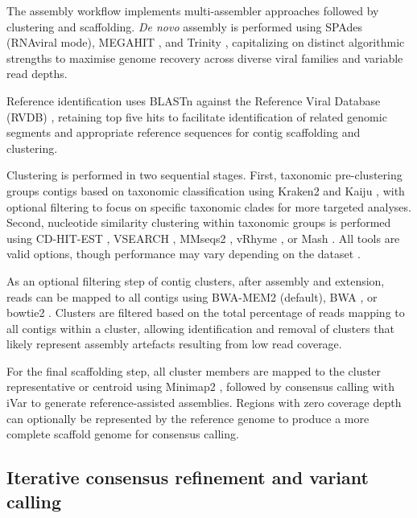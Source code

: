 The assembly workflow implements multi-assembler approaches followed by clustering and scaffolding. \textit{De novo} assembly is performed using SPAdes \citep{Meleshko2021-gb} (RNAviral mode), MEGAHIT \citep{Li2016-sd}, and Trinity \citep{Grabherr2011-ef}, capitalizing on distinct algorithmic strengths to maximise genome recovery across diverse viral families and variable read depths.

Reference identification uses BLASTn \citep{Altschul1990-sy} against the Reference Viral Database (RVDB) \citep{Goodacre2018-dw}, retaining top five hits to facilitate identification of related genomic segments and appropriate reference sequences for contig scaffolding and clustering.

Clustering is performed in two sequential stages. First, taxonomic pre-clustering groups contigs based on taxonomic classification using Kraken2 \citep{Wood2019-jl} and Kaiju \citep{Menzel2016-tz}, with optional filtering to focus on specific taxonomic clades for more targeted analyses. Second, nucleotide similarity clustering within taxonomic groups is performed using CD-HIT-EST \citep{Li2006-nj}, VSEARCH \citep{Rognes2016-ju}, MMseqs2 \citep{Steinegger2017-ci}, vRhyme \citep{Kieft2022-km}, or Mash \citep{Ondov2019-bo}. All tools are valid options, though performance may vary depending on the dataset \citep{Zielezinski2025-vl,Steinegger2017-ci}.

As an optional filtering step of contig clusters, after assembly and extension, reads can be mapped to all contigs using BWA-MEM2 \citep{Vasimuddin2019-rb} (default), BWA \citep{Li2013-pp}, or bowtie2 \citep{Langmead2019-wx}. Clusters are filtered based on the total percentage of reads mapping to all contigs within a cluster, allowing identification and removal of clusters that likely represent assembly artefacts resulting from low read coverage.

For the final scaffolding step, all cluster members are mapped to the cluster representative or centroid using Minimap2 \citep{Li2018-gi}, followed by consensus calling with iVar \citep{Grubaugh2019-xd} to generate reference-assisted assemblies. Regions with zero coverage depth can optionally be represented by the reference genome to produce a more complete scaffold genome for consensus calling.

\subsection{Iterative consensus refinement and variant calling}

